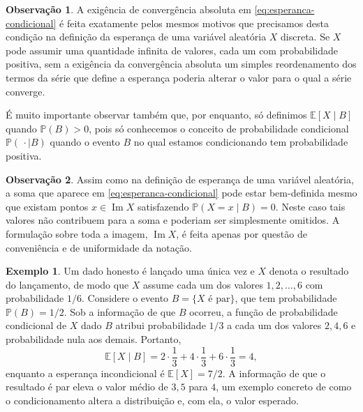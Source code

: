 \documentclass[12pt,portuguese]{article}
\theoremstyle{definition}
\newtheorem{example}[example]{Exemplo}
\newtheorem{remark}[remark]{Observação}
\begin{document}
\begin{remark}\label{rem:esperanca-condicional-existencia}
A exigência de convergência absoluta em \eqref{eq:esperanca-condicional}
é feita exatamente pelos mesmos motivos que precisamos desta condição 
na definição da esperança de uma variável aleatória $X$ discreta. 
Se $X$ pode assumir uma quantidade infinita de valores, cada um com probabilidade positiva,
sem a exigência da convergência absoluta um simples reordenamento dos termos da série
que define a esperança poderia alterar o valor para o qual a série converge. 

É muito importante observar também que, por enquanto, só definimos
\(\mathbb{E}[X \mid B]\) quando \(\mathbb{P}(B) > 0\), pois
só conhecemos o conceito de probabilidade condicional \(\mathbb{P}(\,\cdot \mid B)\) 
quando o evento $B$ no qual estamos condicionando tem probabilidade positiva.
\end{remark}

\begin{remark}\label{rem:esperanca-condicional-para-toda-massa}
Assim como na definição de esperança de uma variável aleatória, 
a soma que aparece em \eqref{eq:esperanca-condicional}
pode estar bem-definida mesmo que existam pontos \(x \in \operatorname{Im} X\)
satisfazendo \(\mathbb{P}(X = x \mid B) = 0\). 
Neste caso tais valores não contribuem para
a soma e poderiam ser simplesmente omitidos. A formulação sobre toda a imagem,
\(\operatorname{Im} X\), é feita apenas por questão de conveniência e de uniformidade da
notação.
\end{remark}

\begin{example}\label{ex:esperanca-condicional-dado}
Um dado honesto é lançado uma única vez e \(X\) denota o resultado do
lançamento, de modo que \(X\) assume cada um dos valores
\(1, 2, \ldots, 6\) com probabilidade \(1/6\). Considere o evento
\(B = \{X \text{ é par}\}\), que tem probabilidade \(\mathbb{P}(B) = 1/2\).
Sob a informação de que \(B\) ocorreu, a função de probabilidade condicional
de \(X\) dado \(B\) atribui probabilidade \(1/3\) a cada um dos valores
\(2, 4, 6\) e probabilidade nula aos demais. Portanto,
\[
\mathbb{E}[X \mid B]
= 2 \cdot \frac{1}{3} + 4 \cdot \frac{1}{3} + 6 \cdot \frac{1}{3}
= 4,
\]
enquanto a esperança incondicional é \(\mathbb{E}[X] = 7/2\). A informação
de que o resultado é par eleva o valor médio de \(3{,}5\) para \(4\), um
exemplo concreto de como o condicionamento altera a distribuição e, com ela,
o valor esperado.
\end{example}
\end{document}
